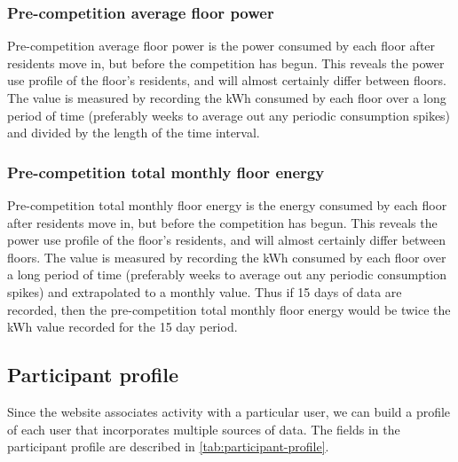 \subsubsection{Pre-competition average floor power}
Pre-competition average floor power is the power consumed by each floor after residents move in, but before the competition has begun. This reveals the power use profile of the floor's residents, and will almost certainly differ between floors. The value is measured by recording the kWh consumed by each floor over a long period of time (preferably weeks to average out any periodic consumption spikes) and divided by the length of the time interval.

\subsubsection{Pre-competition total monthly floor energy}
Pre-competition total monthly floor energy is the energy consumed by each floor after residents move in, but before the competition has begun. This reveals the power use profile of the floor's residents, and will almost certainly differ between floors. The value is measured by recording the kWh consumed by each floor over a long period of time (preferably weeks to average out any periodic consumption spikes) and extrapolated to a monthly value. Thus if 15 days of data are recorded, then the pre-competition total monthly floor energy would be twice the kWh value recorded for the 15 day period.

\subsection{Participant profile}
\label{sec:participant-profile}

Since the website associates activity with a particular user, we can build a profile of each user that incorporates multiple sources of data. The fields in the participant profile are described in \autoref{tab:participant-profile}.

